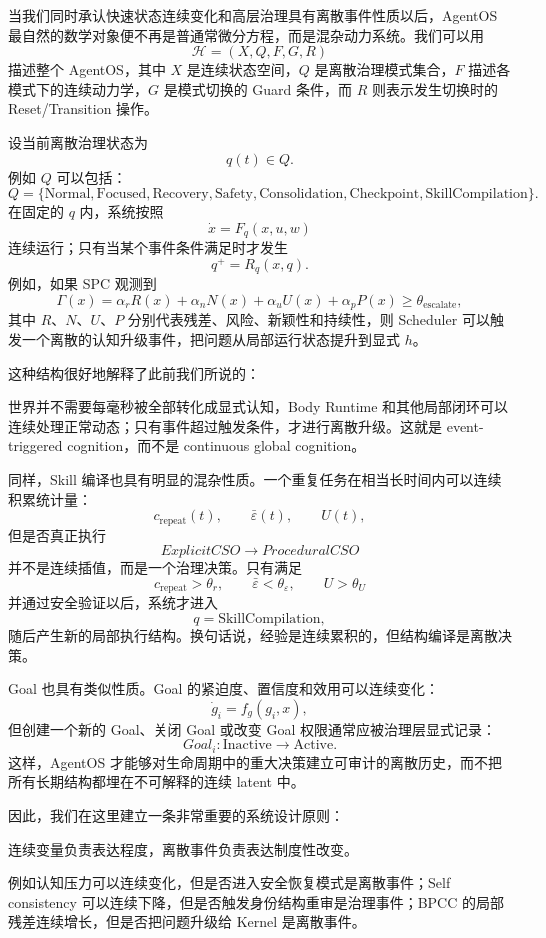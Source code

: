 当我们同时承认快速状态连续变化和高层治理具有离散事件性质以后，AgentOS 最自然的数学对象便不再是普通常微分方程，而是混杂动力系统。我们可以用
\[
\mathcal H
=
(X,Q,F,G,R)
\]
描述整个 AgentOS，其中 $X$ 是连续状态空间，$Q$ 是离散治理模式集合，$F$ 描述各模式下的连续动力学，$G$ 是模式切换的 Guard 条件，而 $R$ 则表示发生切换时的 Reset/Transition 操作。

设当前离散治理状态为
\[
q(t)\in Q.
\]
例如 $Q$ 可以包括：
\[
Q=
\{
\text{Normal},
\text{Focused},
\text{Recovery},
\text{Safety},
\text{Consolidation},
\text{Checkpoint},
\text{SkillCompilation}
\}.
\]
在固定的 $q$ 内，系统按照
\[
\dot{x}
=
F_q(x,u,w)
\]
连续运行；只有当某个事件条件满足时才发生
\[
q^+
=
R_q(x,q).
\]
例如，如果 SPC 观测到
\[
\Gamma(x)
=
\alpha_rR(x)
+
\alpha_nN(x)
+
\alpha_uU(x)
+
\alpha_pP(x)
\geq
\theta_{\mathrm{escalate}},
\]
其中 $R$、$N$、$U$、$P$ 分别代表残差、风险、新颖性和持续性，则 Scheduler 可以触发一个离散的认知升级事件，把问题从局部运行状态提升到显式 $h$。

这种结构很好地解释了此前我们所说的：
\begin{statementbox}
\centering
{}
\end{statementbox}
世界并不需要每毫秒被全部转化成显式认知，Body Runtime 和其他局部闭环可以连续处理正常动态；只有事件超过触发条件，才进行离散升级。这就是 event-triggered cognition，而不是 continuous global cognition。

同样，Skill 编译也具有明显的混杂性质。一个重复任务在相当长时间内可以连续积累统计量：
\[
c_{\mathrm{repeat}}(t),
\qquad
\bar{\varepsilon}(t),
\qquad
U(t),
\]
但是否真正执行
\[
ExplicitCSO
\longrightarrow
ProceduralCSO
\]
并不是连续插值，而是一个治理决策。只有满足
\[
c_{\mathrm{repeat}}>\theta_r,
\qquad
\bar{\varepsilon}<\theta_\varepsilon,
\qquad
U>\theta_U
\]
并通过安全验证以后，系统才进入
\[
q=\text{SkillCompilation},
\]
随后产生新的局部执行结构。换句话说，经验是连续累积的，但结构编译是离散决策。

Goal 也具有类似性质。Goal 的紧迫度、置信度和效用可以连续变化：
\[
\dot g_i=f_g(g_i,x),
\]
但创建一个新的 Goal、关闭 Goal 或改变 Goal 权限通常应被治理层显式记录：
\[
Goal_i:\mathrm{Inactive}\rightarrow\mathrm{Active}.
\]
这样，AgentOS 才能够对生命周期中的重大决策建立可审计的离散历史，而不把所有长期结构都埋在不可解释的连续 latent 中。

因此，我们在这里建立一条非常重要的系统设计原则：
\begin{proposition*}
连续变量负责表达程度，离散事件负责表达制度性改变。
\end{proposition*}
例如认知压力可以连续变化，但是否进入安全恢复模式是离散事件；Self consistency 可以连续下降，但是否触发身份结构重审是治理事件；BPCC 的局部残差连续增长，但是否把问题升级给 Kernel 是离散事件。

